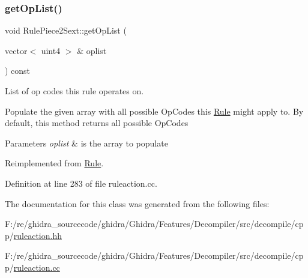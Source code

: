 \subsubsection{\texorpdfstring{getOpList()}{getOpList()}}
{\footnotesize\ttfamily void Rule\+Piece2\+Sext\+::get\+Op\+List (\begin{DoxyParamCaption}\item[{vector$<$ uint4 $>$ \&}]{oplist }\end{DoxyParamCaption}) const\hspace{0.3cm}{\ttfamily [virtual]}}



List of op codes this rule operates on. 

Populate the given array with all possible Op\+Codes this \mbox{\hyperlink{class_rule}{Rule}} might apply to. By default, this method returns all possible Op\+Codes 
\begin{DoxyParams}{Parameters}
{\em oplist} & is the array to populate \\
\hline
\end{DoxyParams}


Reimplemented from \mbox{\hyperlink{class_rule_a4023bfc7825de0ab866790551856d10e}{Rule}}.



Definition at line 283 of file ruleaction.\+cc.



The documentation for this class was generated from the following files\+:\begin{DoxyCompactItemize}
\item 
F\+:/re/ghidra\+\_\+sourcecode/ghidra/\+Ghidra/\+Features/\+Decompiler/src/decompile/cpp/\mbox{\hyperlink{ruleaction_8hh}{ruleaction.\+hh}}\item 
F\+:/re/ghidra\+\_\+sourcecode/ghidra/\+Ghidra/\+Features/\+Decompiler/src/decompile/cpp/\mbox{\hyperlink{ruleaction_8cc}{ruleaction.\+cc}}\end{DoxyCompactItemize}
